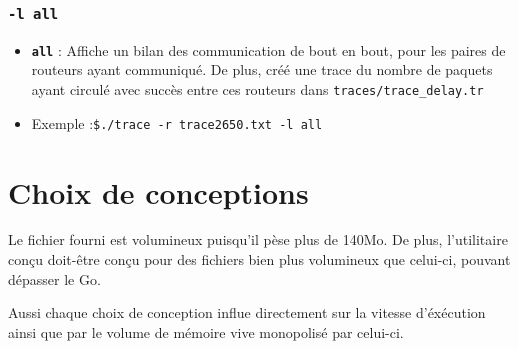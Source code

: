 \documentclass[
10pt, %
a4paper, %
oneside, %
headinclude,footinclude, %
BCOR5mm, %
]{scrartcl}
\begin{document}
\subsubsection{\texttt{-l all}}
\begin{itemize}
  \item \textbf{\texttt{all}} : Affiche un bilan des communication de bout en bout, pour les paires de routeurs ayant communiqué. \newline De plus, créé une trace du nombre de paquets ayant circulé avec succès entre ces routeurs dans \texttt{traces/trace\_delay.tr}
  \item Exemple :\newline\texttt{\$./trace -r trace2650.txt -l all}
\end{itemize}


\section{Choix de conceptions}
Le fichier fourni est volumineux puisqu'il pèse plus de 140Mo. De plus, l'utilitaire conçu doit-être conçu pour des fichiers bien plus volumineux que celui-ci, pouvant dépasser le Go. 

Aussi chaque choix de conception influe directement sur la vitesse d'éxécution ainsi que par le volume de mémoire vive monopolisé par celui-ci.
\end{document}
